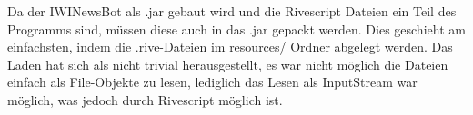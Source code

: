 Da der IWINewsBot als .jar gebaut wird und die Rivescript Dateien ein Teil des Programms sind, müssen diese auch in das .jar gepackt werden. Dies geschieht am einfachsten, indem die .rive-Dateien im resources/ Ordner abgelegt werden. Das Laden hat sich als nicht trivial herausgestellt, es war nicht möglich die Dateien einfach als File-Objekte zu lesen, lediglich das Lesen als InputStream war möglich, was jedoch durch Rivescript möglich ist.

